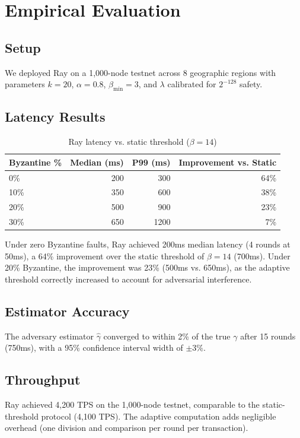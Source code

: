 \section{Empirical Evaluation}

\label{sec:ray-evaluation}

\subsection{Setup}

We deployed Ray on a 1,000-node testnet across 8 geographic regions with parameters
$k = 20$, $\alpha = 0.8$, $\beta_{\min} = 3$, and $\lambda$ calibrated for $2^{-128}$ safety.

\subsection{Latency Results}

\begin{table}[h]
\centering
\begin{tabular}{@{}lrrr@{}}
\toprule
\textbf{Byzantine \%} & \textbf{Median (ms)} & \textbf{P99 (ms)} & \textbf{Improvement vs. Static} \\
\midrule
0\% & 200 & 300 & 64\% \\
10\% & 350 & 600 & 38\% \\
20\% & 500 & 900 & 23\% \\
30\% & 650 & 1200 & 7\% \\
\bottomrule
\end{tabular}
\caption{Ray latency vs. static threshold ($\beta = 14$)}
\label{tab:ray-latency}
\end{table}

Under zero Byzantine faults, Ray achieved 200ms median latency (4 rounds at 50ms),
a 64\% improvement over the static threshold of $\beta = 14$ (700ms). Under 20\%
Byzantine, the improvement was 23\% (500ms vs. 650ms), as the adaptive threshold
correctly increased to account for adversarial interference.

\subsection{Estimator Accuracy}

The adversary estimator $\hat{\gamma}$ converged to within 2\% of the true $\gamma$
after 15 rounds (750ms), with a 95\% confidence interval width of $\pm 3\%$.

\subsection{Throughput}

Ray achieved 4,200 TPS on the 1,000-node testnet, comparable to the static-threshold
protocol (4,100 TPS). The adaptive computation adds negligible overhead (one division
and comparison per round per transaction).

